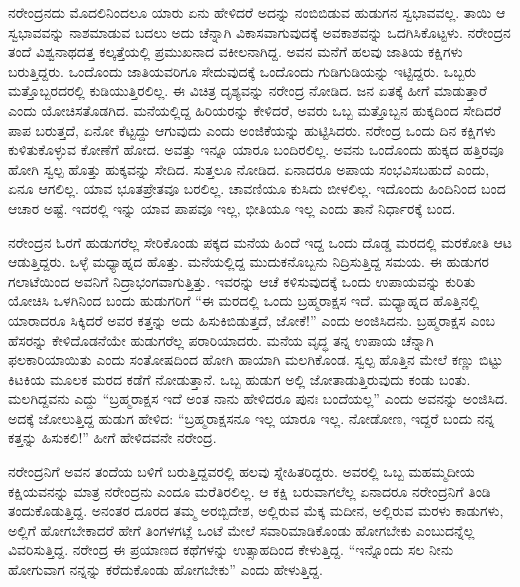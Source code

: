 ನರೇಂದ್ರನದು ಮೊದಲಿನಿಂದಲೂ ಯಾರು ಏನು ಹೇಳಿದರೆ ಅದನ್ನು ನಂಬಿಬಿಡುವ ಹುಡುಗನ ಸ್ವಭಾವವಲ್ಲ. ತಾಯಿ ಆ ಸ್ವಭಾವವನ್ನು ನಾಶಮಾಡುವ ಬದಲು ಅದು ಚೆನ್ನಾಗಿ ವಿಕಾಸವಾಗುವುದಕ್ಕೆ ಅವಕಾಶವನ್ನು ಒದಗಿಸಿಕೊಟ್ಟಳು. ನರೇಂದ್ರನ ತಂದೆ ವಿಶ್ವನಾಥದತ್ತ ಕಲ್ಕತ್ತೆಯಲ್ಲಿ ಪ್ರಮುಖನಾದ ವಕೀಲನಾಗಿದ್ದ. ಅವನ ಮನೆಗೆ ಹಲವು ಜಾತಿಯ ಕಕ್ಷಿಗಳು ಬರುತ್ತಿದ್ದರು. ಒಂದೊಂದು ಜಾತಿಯವರಿಗೂ ಸೇದುವುದಕ್ಕೆ ಒಂದೊಂದು ಗುಡಿಗುಡಿಯನ್ನು ಇಟ್ಟಿದ್ದರು. ಒಬ್ಬರು ಮತ್ತೊಬ್ಬರದರಲ್ಲಿ ಕುಡಿಯುತ್ತಿರಲಿಲ್ಲ. ಈ ವಿಚಿತ್ರ ದೃಶ್ಯವನ್ನು ನರೇಂದ್ರ ನೋಡಿದ. ಜನ ಏತಕ್ಕೆ ಹೀಗೆ ಮಾಡುತ್ತಾರೆ ಎಂದು ಯೋಚಿಸತೊಡಗಿದ. ಮನೆಯಲ್ಲಿದ್ದ ಹಿರಿಯರನ್ನು ಕೇಳಿದರೆ, ಅವರು ಒಬ್ಬ ಮತ್ತೊಬ್ಬನ ಹುಕ್ಕದಿಂದ ಸೇದಿದರೆ ಪಾಪ ಬರುತ್ತದೆ, ಏನೋ ಕೆಟ್ಟದ್ದು ಆಗುವುದು ಎಂದು ಅಂಜಿಕೆಯನ್ನು ಹುಟ್ಟಿಸಿದರು. ನರೇಂದ್ರ ಒಂದು ದಿನ ಕಕ್ಷಿಗಳು ಕುಳಿತುಕೊಳ್ಳುವ ಕೋಣೆಗೆ ಹೋದ. ಅವತ್ತು ಇನ್ನೂ ಯಾರೂ ಬಂದಿರಲಿಲ್ಲ. ಅವನು ಒಂದೊಂದು ಹುಕ್ಕದ ಹತ್ತಿರವೂ ಹೋಗಿ ಸ್ವಲ್ಪ ಹೊತ್ತು ಹುಕ್ಕವನ್ನು ಸೇದಿದ. ಸುತ್ತಲೂ ನೋಡಿದ. ಏನಾದರೂ ಅಪಾಯ ಸಂಭವಿಸಬಹುದೆ ಎಂದು, ಏನೂ ಆಗಲಿಲ್ಲ. ಯಾವ ಭೂತಪ್ರೇತವೂ ಬರಲಿಲ್ಲ. ಚಾವಣಿಯೂ ಕುಸಿದು ಬೀಳಲಿಲ್ಲ. ಇದೊಂದು ಹಿಂದಿನಿಂದ ಬಂದ ಆಚಾರ ಅಷ್ಟೆ. ಇದರಲ್ಲಿ ಇನ್ನು ಯಾವ ಪಾಪವೂ ಇಲ್ಲ, ಭೀತಿಯೂ ಇಲ್ಲ ಎಂದು ತಾನೆ ನಿರ್ಧಾರಕ್ಕೆ ಬಂದ. 

ನರೇಂದ್ರನ ಓರಗೆ ಹುಡುಗರೆಲ್ಲ ಸೇರಿಕೊಂಡು ಪಕ್ಕದ ಮನೆಯ ಹಿಂದೆ ಇದ್ದ ಒಂದು ದೊಡ್ಡ ಮರದಲ್ಲಿ ಮರಕೋತಿ ಆಟ ಆಡುತ್ತಿದ್ದರು. ಒಳ್ಳೆ ಮಧ್ಯಾಹ್ನದ ಹೊತ್ತು. ಮನೆಯಲ್ಲಿದ್ದ ಮುದುಕನೊಬ್ಬನು ನಿದ್ರಿಸುತ್ತಿದ್ದ ಸಮಯ. ಈ ಹುಡುಗರ ಗಲಾಟೆಯಿಂದ ಅವನಿಗೆ ನಿದ್ರಾಭಂಗವಾಗುತ್ತಿತ್ತು. ಇವರನ್ನು ಆಚೆ ಕಳಿಸುವುದಕ್ಕೆ ಒಂದು ಉಪಾಯವನ್ನು ಕುರಿತು ಯೋಚಿಸಿ ಒಳಗಿನಿಂದ ಬಂದು ಹುಡುಗರಿಗೆ “ಈ ಮರದಲ್ಲಿ ಒಂದು ಬ್ರಹ್ಮರಾಕ್ಷಸ ಇದೆ. ಮಧ್ಯಾಹ್ನದ ಹೊತ್ತಿನಲ್ಲಿ ಯಾರಾದರೂ ಸಿಕ್ಕಿದರೆ ಅವರ ಕತ್ತನ್ನು ಅದು ಹಿಸುಕಿಬಿಡುತ್ತದೆ, ಜೋಕೆ!” ಎಂದು ಅಂಜಿಸಿದನು. ಬ್ರಹ್ಮರಾಕ್ಷಸ ಎಂಬ ಹೆಸರನ್ನು ಕೇಳಿದೊಡನೆಯೇ ಹುಡುಗರೆಲ್ಲ ಪರಾರಿಯಾದರು. ಮನೆಯ ವೃದ್ಧ ತನ್ನ ಉಪಾಯ ಚೆನ್ನಾಗಿ ಫಲಕಾರಿಯಾಯಿತು ಎಂದು ಸಂತೋಷದಿಂದ ಹೋಗಿ ಹಾಯಾಗಿ ಮಲಗಿಕೊಂಡ. ಸ್ವಲ್ಪ ಹೊತ್ತಿನ ಮೇಲೆ ಕಣ್ಣು ಬಿಟ್ಟು ಕಿಟಕಿಯ ಮೂಲಕ ಮರದ ಕಡೆಗೆ ನೋಡುತ್ತಾನೆ. ಒಬ್ಬ ಹುಡುಗ ಅಲ್ಲಿ ಜೋತಾಡುತ್ತಿರುವುದು ಕಂಡು ಬಂತು. ಮಲಗಿದ್ದವನು ಎದ್ದು “ಬ್ರಹ್ಮರಾಕ್ಷಸ ಇದೆ ಅಂತ ನಾನು ಹೇಳಿದರೂ ಪುನಃ ಬಂದೆಯಲ್ಲ” ಎಂದು ಅವನನ್ನು ಅಂಜಿಸಿದ. ಅದಕ್ಕೆ ಜೋಲುತ್ತಿದ್ದ ಹುಡುಗ ಹೇಳಿದ: “ಬ್ರಹ್ಮರಾಕ್ಷಸನೂ ಇಲ್ಲ ಯಾರೂ ಇಲ್ಲ. ನೋಡೋಣ, ಇದ್ದರೆ ಬಂದು ನನ್ನ ಕತ್ತನ್ನು ಹಿಸುಕಲಿ!” ಹೀಗೆ ಹೇಳಿದವನೇ ನರೇಂದ್ರ. 

ನರೇಂದ್ರನಿಗೆ ಅವನ ತಂದೆಯ ಬಳಿಗೆ ಬರುತ್ತಿದ್ದವರಲ್ಲಿ ಹಲವು ಸ್ನೇಹಿತರಿದ್ದರು. ಅವರಲ್ಲಿ ಒಬ್ಬ ಮಹಮ್ಮದೀಯ ಕಕ್ಷಿಯವನನ್ನು ಮಾತ್ರ ನರೇಂದ್ರನು ಎಂದೂ ಮರೆತಿರಲಿಲ್ಲ. ಆ ಕಕ್ಷಿ ಬರುವಾಗಲೆಲ್ಲ ಏನಾದರೂ ನರೇಂದ್ರನಿಗೆ ತಿಂಡಿ ತಂದುಕೊಡುತ್ತಿದ್ದ. ಅನಂತರ ದೂರದ ತಮ್ಮ ಅರಬ್ಬಿದೇಶ, ಅಲ್ಲಿರುವ ಮೆಕ್ಕ ಮದೀನ, ಅಲ್ಲಿರುವ ಮರಳು ಕಾಡುಗಳು, ಅಲ್ಲಿಗೆ ಹೋಗಬೇಕಾದರೆ ಹೇಗೆ ತಿಂಗಳಗಟ್ಲೆ ಒಂಟೆ ಮೇಲೆ ಸವಾರಿಮಾಡಿಕೊಂಡು ಹೋಗಬೇಕು ಎಂಬುದನ್ನೆಲ್ಲ ವಿವರಿಸುತ್ತಿದ್ದ. ನರೇಂದ್ರ ಈ ಪ್ರಯಾಣದ ಕಥೆಗಳನ್ನು ಉತ್ಸಾಹದಿಂದ ಕೇಳುತ್ತಿದ್ದ. “ಇನ್ನೊಂದು ಸಲ ನೀನು ಹೋಗುವಾಗ ನನ್ನನ್ನು ಕರೆದುಕೊಂಡು ಹೋಗಬೇಕು” ಎಂದು ಹೇಳುತ್ತಿದ್ದ. 


